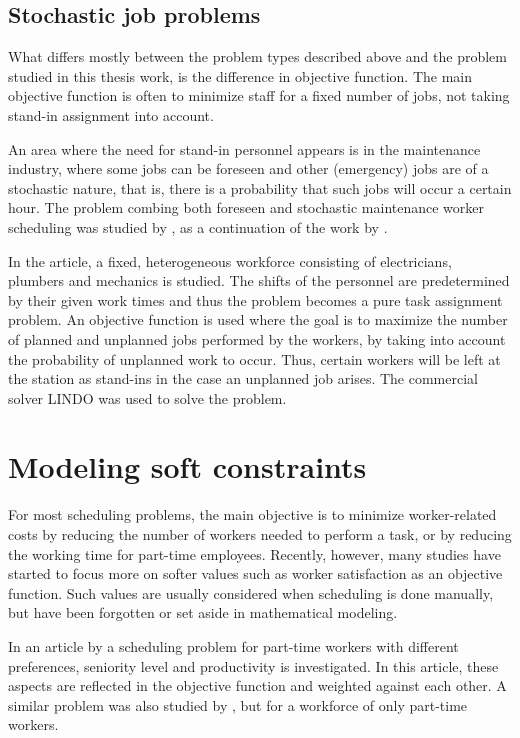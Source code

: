 \subsection{Stochastic job problems} \label{STOCH}
What differs mostly between the problem types described above and the problem studied in this thesis work, is the difference in objective function. The main objective function is often to minimize staff for a fixed number of jobs, not taking stand-in assignment into account.

An area where the need for stand-in personnel appears is in the  maintenance industry, where some jobs can be foreseen and other (emergency) jobs are of a stochastic nature, that is, there is a probability that such jobs will occur a certain hour. The problem combing both foreseen and stochastic maintenance worker scheduling was studied by \citet{duffuaa_1999}, as a continuation of the work by \citet{roberts_1983}. 

In the article, a fixed, heterogeneous workforce consisting of electricians, plumbers and mechanics is studied. The shifts of the personnel are predetermined by their given work times and thus the problem becomes a pure task assignment problem. An objective function is used where the goal is to maximize the number of planned and unplanned jobs performed by the workers, by taking into account the probability of unplanned work to occur. Thus, certain workers will be left at the station as stand-ins in the case an unplanned job arises. The commercial solver LINDO was used to solve the problem.


\section{Modeling soft constraints} \label{MSC}
For most scheduling problems, the main objective is to minimize worker-related costs by reducing the number of workers needed to perform a task, or by reducing the working time for part-time employees. Recently, however, many studies have started to focus more on softer values such as worker satisfaction as an objective function. Such values are usually considered when scheduling is done manually, but have been forgotten or set aside in mathematical modeling.

 In an article by \citet{akbari_2013} a scheduling problem for part-time workers with different preferences, seniority level and productivity is investigated. In this article, these aspects are reflected in the objective function and weighted against each other. A similar problem was also studied by \citet{mohan_2008}, but for a workforce of only part-time workers. %

